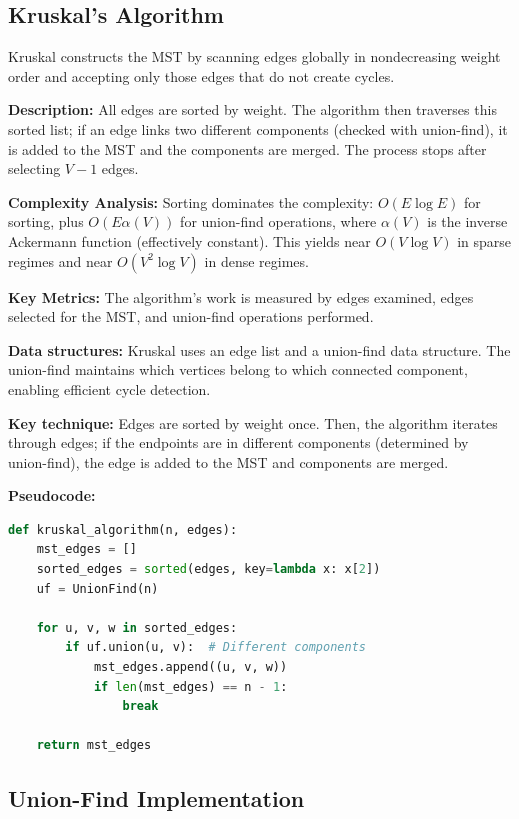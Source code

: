 \documentclass{labreport}
\begin{document}
\subsection{Kruskal's Algorithm}

Kruskal constructs the MST by scanning edges globally in nondecreasing weight order and accepting only those edges that do not create cycles.

\textbf{Description:} All edges are sorted by weight. The algorithm then traverses this sorted list; if an edge links two different components (checked with union-find), it is added to the MST and the components are merged. The process stops after selecting $V - 1$ edges.

\textbf{Complexity Analysis:}
Sorting dominates the complexity: $O(E \log E)$ for sorting, plus $O(E \alpha(V))$ for union-find operations, where $\alpha(V)$ is the inverse Ackermann function (effectively constant). This yields near $O(V \log V)$ in sparse regimes and near $O(V^2 \log V)$ in dense regimes.

\textbf{Key Metrics:} The algorithm's work is measured by edges examined, edges selected for the MST, and union-find operations performed.

\textbf{Data structures:} Kruskal uses an edge list and a union-find data structure. The union-find maintains which vertices belong to which connected component, enabling efficient cycle detection.

\textbf{Key technique:} Edges are sorted by weight once. Then, the algorithm iterates through edges; if the endpoints are in different components (determined by union-find), the edge is added to the MST and components are merged.

\textbf{Pseudocode:}
\begin{lstlisting}[language=Python]
def kruskal_algorithm(n, edges):
    mst_edges = []
    sorted_edges = sorted(edges, key=lambda x: x[2])
    uf = UnionFind(n)

    for u, v, w in sorted_edges:
        if uf.union(u, v):  # Different components
            mst_edges.append((u, v, w))
            if len(mst_edges) == n - 1:
                break

    return mst_edges
\end{lstlisting}

\subsection{Union-Find Implementation}
\end{document}
